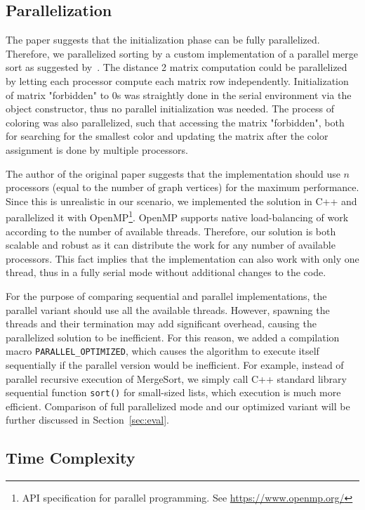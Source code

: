 \documentclass[11pt,a4paper]{article}
\begin{document}
\subsection{Parallelization}
\label{ssec:parallel_parallelization}

The paper suggests that the initialization phase can be fully parallelized. Therefore, we parallelized sorting by a custom implementation of a parallel merge sort as suggested by~\cite{bukata_advancedOpenMP}. The distance 2 matrix computation could be parallelized by letting each processor compute each matrix row independently. Initialization of matrix "forbidden" to 0s was straightly done in the serial environment via the object constructor, thus no parallel initialization was needed. The process of coloring was also parallelized, such that accessing the matrix "forbidden", both for searching for the smallest color and updating the matrix after the color assignment is done by multiple processors.

The author of the original paper suggests that the implementation should use $n$ processors (equal to the number of graph vertices) for the maximum performance. Since this is unrealistic in our scenario, we implemented the solution in C++ and parallelized it with OpenMP\footnote{API specification for parallel programming. See \url{https://www.openmp.org/}}. OpenMP supports native load-balancing of work according to the number of available threads. Therefore, our solution is both scalable and robust as it can distribute the work for any number of available processors. This fact implies that the implementation can also work with only one thread, thus in a fully serial mode without additional changes to the code.

For the purpose of comparing sequential and parallel implementations, the parallel variant should use all the available threads. However, spawning the threads and their termination may add significant overhead, causing the parallelized solution to be inefficient. For this reason, we added a compilation macro \texttt{PARALLEL\_OPTIMIZED}, which causes the algorithm to execute itself sequentially if the parallel version would be inefficient. For example, instead of parallel recursive execution of MergeSort, we simply call C++ standard library sequential function \texttt{sort()} for small-sized lists, which execution is much more efficient. Comparison of full parallelized mode and our optimized variant will be further discussed in Section~\ref{sec:eval}.

\subsection{Time Complexity}
\label{ssec:parallel_timeComplex}
\end{document}
